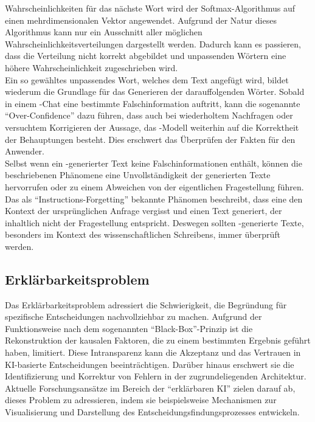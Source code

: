 \documentclass[../main.tex]{subfiles}
\begin{document}
Wahrscheinlichkeiten für das nächste Wort wird der Softmax-Algorithmus auf einen mehrdimensionalen Vektor angewendet. Aufgrund der Natur dieses Algorithmus kann nur 
ein Ausschnitt aller möglichen Wahrscheinlichkeitsverteilungen dargestellt werden. Dadurch kann es passieren, dass die Verteilung nicht korrekt abgebildet und 
unpassenden Wörtern eine höhere Wahrscheinlichkeit zugeschrieben wird.\cite{softmax} \\
Ein so gewähltes unpassendes Wort, welches dem Text angefügt wird, bildet wiederum die Grundlage für das Generieren der darauffolgenden Wörter. Sobald in einem -Chat eine 
bestimmte Falschinformation auftritt, kann die sogenannte "`Over-Confidence"' dazu führen, dass auch bei wiederholtem Nachfragen oder versuchtem Korrigieren der 
Aussage, das -Modell weiterhin auf die Korrektheit der Behauptungen besteht. Dies erschwert das Überprüfen der Fakten für den Anwender.\cite{allgemHalluzinationen,softmax} \\
Selbst wenn ein -generierter Text keine Falschinformationen enthält, können die beschriebenen Phänomene eine Unvollständigkeit der generierten Texte hervorrufen 
oder zu einem Abweichen von der eigentlichen Fragestellung führen.  Das als "`Instructions-Forgetting"' bekannte Phänomen beschreibt, dass eine  den Kontext der 
ursprünglichen Anfrage vergisst und einen Text generiert, der inhaltlich nicht der Fragestellung entspricht. Deswegen sollten -generierte Texte, besonders im Kontext 
des wissenschaftlichen Schreibens, immer überprüft werden.\cite{allgemHalluzinationen}


\subsection{Erklärbarkeitsproblem}
\label{sec:erklärbarkeitsproblem}

Das Erklärbarkeitsproblem adressiert die Schwierigkeit, die Begründung für spezifische Entscheidungen  nachvollziehbar zu machen. Aufgrund der Funktionsweise nach dem sogenannten 
"`Black-Box"'-Prinzip ist die Rekonstruktion der kausalen Faktoren, die zu einem bestimmten Ergebnis geführt haben, limitiert. Diese Intransparenz kann die Akzeptanz und das Vertrauen in 
KI-basierte Entscheidungen beeinträchtigen. Darüber hinaus erschwert sie die Identifizierung und Korrektur von Fehlern in der zugrundeliegenden Architektur. Aktuelle Forschungsansätze 
im Bereich der "`erklärbaren KI"' zielen darauf ab, dieses Problem zu adressieren, indem sie beispielsweise Mechanismen zur Visualisierung und Darstellung des 
Entscheidungsfindungsprozesses entwickeln.\cite{explainable}
 
\end{document}
